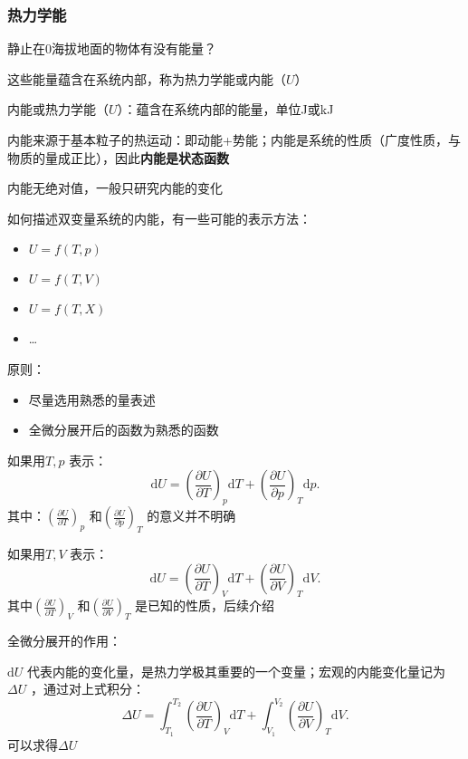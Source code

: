 \subsubsection*{热力学能}%
\label{subsub*:热力学能}
\begin{question}
    静止在0海拔地面的物体有没有能量？
\end{question}
这些能量蕴含在系统内部，称为热力学能或内能（$U$）
\begin{defi}
    内能或热力学能（$U$）：蕴含在系统内部的能量，单位J或kJ
\end{defi}
内能来源于基本粒子的热运动：即动能+势能；内能是系统的性质（广度性质，与物质的量成正比），因此\textbf{内能是状态函数}
\begin{notation}
    内能无绝对值，一般只研究内能的变化
\end{notation}
如何描述双变量系统的内能，有一些可能的表示方法：
\begin{itemize}
    \item $U=f\left( T,p \right)$
    \item $U=f\left( T,V \right)$
    \item $U=f\left( T,X \right)$
    \item \ldots 
    
\end{itemize}
原则：
\begin{itemize}
    \item 尽量选用熟悉的量表述
    \item 全微分展开后的函数为熟悉的函数
    
\end{itemize}
\begin{eg}
    如果用$T,p$ 表示： \[
        \mathrm{d}U=\left(\frac{\partial U}{\partial T}\right)_{p}\mathrm{d}T + \left(\frac{\partial U}{\partial p}\right)_{T}\mathrm{d}p
    .\]
    其中：$\left(\frac{\partial U}{\partial T}\right)_{p}$ 和$\left(\frac{\partial U}{\partial p}\right)_{T}$ 的意义并不明确

    如果用$T,V$ 表示：
    \[
        \mathrm{d}U = \left(\frac{\partial U}{\partial T}\right)_{V}\mathrm{d}T + \left(\frac{\partial U}{\partial V}\right)_{T}\mathrm{d}V
    .\]
    其中$\left(\frac{\partial U}{\partial T}\right)_{V}$ 和$\left(\frac{\partial U}{\partial V}\right)_{T}$ 是已知的性质，后续介绍
\end{eg}
全微分展开的作用：
\begin{eg}
$\mathrm{d}U$ 代表内能的变化量，是热力学极其重要的一个变量；宏观的内能变化量记为$\Delta U$ ，通过对上式积分：\[
    \Delta U = \int_{T_1}^{T_2} \left(\frac{\partial U}{\partial T}\right)_{V} \mathrm{d}T + \int_{V_1}^{V_2} \left(\frac{\partial U}{\partial V}\right)_{T} \mathrm{d}V
.\]
可以求得$\Delta U$
\end{eg}
